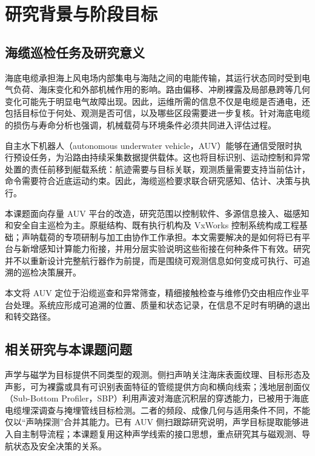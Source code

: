 \chapter{研究背景与阶段目标}\label{chap:middle-background}
\section{海缆巡检任务及研究意义}

海底电缆承担海上风电场内部集电与海陆之间的电能传输，其运行状态同时受到电气负荷、海床变化和外部机械作用的影响。路由偏移、冲刷裸露及局部悬跨等几何变化可能先于明显电气故障出现。因此，运维所需的信息不仅是电缆是否通电，还包括目标位于何处、观测是否可信，以及哪些区段需要进一步复核。针对海底电缆的损伤与寿命分析也强调，机械载荷与环境条件必须共同进入评估过程\cite{dinmohammadi2019predicting}。

自主水下机器人（autonomous underwater vehicle，AUV）能够在通信受限时执行预设任务，为沿路由持续采集数据提供载体。这也将目标识别、运动控制和异常处置的责任前移到艇载系统：航迹需要与目标关联，观测质量需要支持当前估计，命令需要符合近底运动约束。因此，海缆巡检要求联合研究感知、估计、决策与执行。

本课题面向存量 AUV 平台的改造，研究范围以控制软件、多源信息接入、磁感知和安全自主巡检为主。原艇结构、既有执行机构及 VxWorks 控制系统构成工程基础；声呐载荷的专项研制与加工由协作工作承担。本文需要解决的是如何将已有平台与新增感知计算能力衔接，并用分层实验说明这些衔接在何种条件下有效。研究并不以重新设计完整航行器作为前提，而是围绕可观测信息如何变成可执行、可追溯的巡检决策展开。

本文将 AUV 定位于沿缆巡查和异常筛查，精细接触检查与维修仍交由相应作业平台处理。系统应形成可追溯的位置、质量和状态记录，在信息不足时有明确的退出和转交路径。

\section{相关研究与本课题问题}

声学与磁学为目标提供不同类型的观测。侧扫声呐关注海床表面纹理、目标形态及声影，可为裸露或具有可识别表面特征的管缆提供方向和横向线索；浅地层剖面仪（Sub-Bottom Profiler，SBP）利用声波对海底沉积层的穿透能力，已被用于海底电缆埋深调查与掩埋管线目标检测\cite{wunderlich2016burial,zheng2021zeroshot}。二者的频段、成像几何与适用条件不同，不能仅以“声呐探测”合并其能力。已有 AUV 侧扫跟踪研究说明，声学目标提取能够进入自主制导流程\cite{bagnitsky2011sidescan,feng2023automatic}；本课题复用这种声学线索的接口思想，重点研究其与磁观测、导航状态及安全决策的关系。

